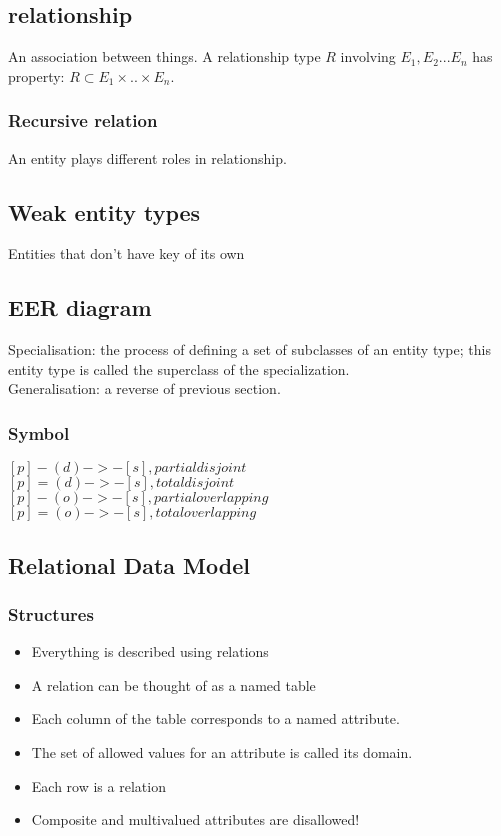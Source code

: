 \documentclass[a4paper]{scrartcl}
\begin{document}
  \subsection{relationship}
    An association between things. A relationship type $R$ involving $E_1,E_2...E_n$ has property: $R \subset E_1 \times .. \times E_n$.
    \subsubsection{Recursive relation}
      An entity plays different roles in relationship.
  \subsection{Weak entity types}
    Entities that don't have key of its own
  \subsection{EER diagram}
    Specialisation: the process of defining a set of subclasses of an entity type; this entity type is called the superclass of the specialization.
    \\
    Generalisation: a reverse of previous section.
    \subsubsection{Symbol}
    $[p] - (d) ->- [s], partial disjoint$\\
    $[p] = (d) ->- [s], total disjoint$\\
    $[p] - (o) ->- [s], partial overlapping$\\
    $[p] = (o) ->- [s], total overlapping$\\
  \subsection{Relational Data Model}
    \subsubsection{Structures}
      \begin{itemize}
        \item Everything is described using relations
        \item A relation can be thought of as a named table
        \item Each column of the table corresponds to a named attribute.
        \item The set of allowed values for an attribute is called its domain.
        \item Each row is a relation
        \item Composite and multivalued attributes are disallowed!  
      \end{itemize}
\end{document}
